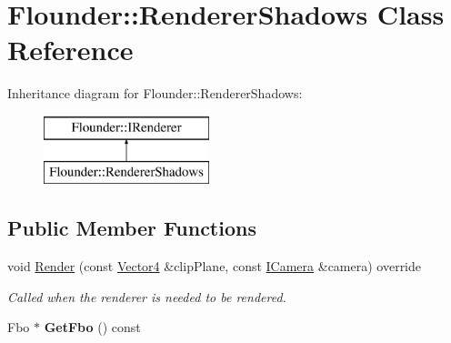 \hypertarget{class_flounder_1_1_renderer_shadows}{}\section{Flounder\+:\+:Renderer\+Shadows Class Reference}
\label{class_flounder_1_1_renderer_shadows}
Inheritance diagram for Flounder\+:\+:Renderer\+Shadows\+:\begin{figure}[H]
\begin{center}
\leavevmode
\includegraphics[height=2.000000cm]{class_flounder_1_1_renderer_shadows}
\end{center}
\end{figure}
\subsection*{Public Member Functions}
\begin{DoxyCompactItemize}
\item 
void \hyperlink{class_flounder_1_1_renderer_shadows_a39c5548d3cbe75ce7bfe346d209af7a9}{Render} (const \hyperlink{class_flounder_1_1_vector4}{Vector4} \&clip\+Plane, const \hyperlink{class_flounder_1_1_i_camera}{I\+Camera} \&camera) override
\begin{DoxyCompactList}\small\item\em Called when the renderer is needed to be rendered. \end{DoxyCompactList}\item 
\mbox{\label{class_flounder_1_1_renderer_shadows_aeb3c737cb8aecdb144085710f87bdd27}} 
Fbo $\ast$ {\bfseries Get\+Fbo} () const
\end{DoxyCompactItemize}
